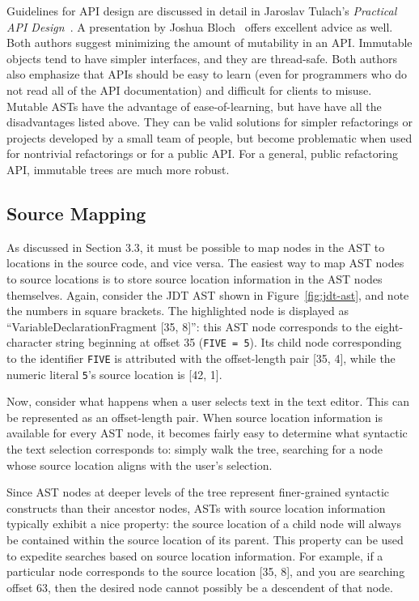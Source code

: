 \documentclass[prodmode]{acmlarge}
\newcommand{\ttt}[1]{\texttt{#1}}
\begin{document}
Guidelines for API design are discussed in detail in Jaroslav Tulach's
\textit{Practical API Design}~\cite{tulach08practical}.  A presentation by
Joshua Bloch~\cite{bloch} offers excellent advice as well.  Both authors
suggest minimizing the amount of mutability in an API.  Immutable objects tend
to have simpler interfaces, and they are thread-safe.  Both authors also
emphasize that APIs should be easy to learn (even for programmers who do not
read all of the API documentation) and difficult for clients to misuse. Mutable
ASTs have the advantage of ease-of-learning, but have have all the disadvantages
listed above. They can be valid solutions for simpler refactorings or projects
developed by a small team of people, but become problematic when used for 
nontrivial refactorings or for a public API. For a general, public refactoring
API, immutable trees are much more robust.


\subsection{Source Mapping}

As discussed in Section 3.3, it must be possible to map nodes in the AST to
locations in the source code, and vice versa. The easiest way to map AST nodes to source locations is to store source
location information in the AST nodes themselves.  Again, consider the JDT AST
shown in Figure~\ref{fig:jdt-ast}, and note the numbers in square brackets.
The highlighted node is displayed as ``VariableDeclarationFragment [35, 8]'':
this AST node corresponds to the eight-character string beginning at offset 35
(\ttt{FIVE = 5}).  Its child node corresponding to the identifier \ttt{FIVE} is
attributed with the offset-length pair [35, 4], while the numeric literal
\ttt{5}'s source location is [42, 1].

Now, consider what happens when a user selects text in the text editor.  This
can be represented as an offset-length pair.  When source location information
is available for every AST node, it becomes fairly easy to determine what
syntactic the text selection corresponds to: simply
walk the tree, searching for a node whose source location aligns with the
user's selection.

Since AST nodes at deeper levels of the tree represent finer-grained syntactic
constructs than their ancestor nodes, ASTs with source location information
typically exhibit a nice property: the source location of a child node will
always be contained within the source location of its parent.  This property
can be used to expedite searches based on source location information.  For
example, if a particular node corresponds to the source location [35, 8], and
you are searching offset 63, then the desired node cannot possibly be a
descendent of that node.
\end{document}
